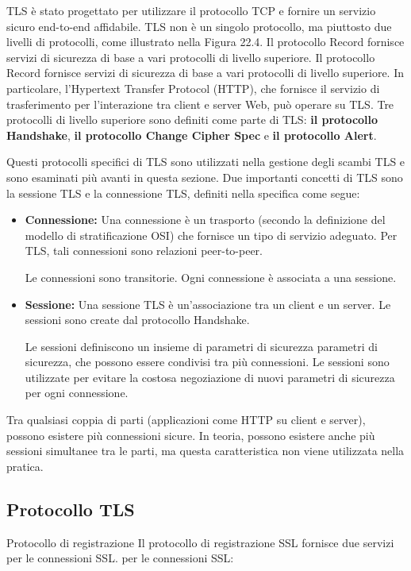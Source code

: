 TLS è stato progettato per utilizzare il protocollo TCP e fornire un servizio sicuro end-to-end affidabile. TLS non è un singolo protocollo, ma piuttosto due livelli di protocolli, come illustrato nella Figura 22.4. Il protocollo Record fornisce servizi di sicurezza di base a vari protocolli di livello superiore. Il protocollo Record fornisce servizi di sicurezza di base a vari protocolli di livello superiore. In particolare, l'Hypertext Transfer Protocol (HTTP), che fornisce il servizio di trasferimento per l'interazione tra client e server Web, può operare su TLS. Tre protocolli di livello superiore sono definiti come parte di TLS: \textbf{il protocollo Handshake}, \textbf{il protocollo Change Cipher Spec} e \textbf{il protocollo Alert}. 

\singlespacing

Questi protocolli specifici di TLS sono utilizzati nella gestione degli scambi TLS e sono esaminati più avanti in questa sezione. Due importanti concetti di TLS sono la sessione TLS e la connessione TLS, definiti nella specifica come segue:
\begin{itemize}
    \item \textbf{Connessione:} Una connessione è un trasporto (secondo la definizione del modello di stratificazione OSI) che fornisce un tipo di servizio adeguato. Per TLS, tali connessioni sono relazioni peer-to-peer.
    
    Le connessioni sono transitorie. Ogni connessione è associata a una sessione.
    
    \item \textbf{Sessione:} Una sessione TLS è un'associazione tra un client e un server. Le sessioni sono create dal protocollo Handshake. 
    
    Le sessioni definiscono un insieme di parametri di sicurezza parametri di sicurezza, che possono essere condivisi tra più connessioni. Le sessioni sono utilizzate per evitare la costosa negoziazione di nuovi parametri di sicurezza per ogni connessione.
\end{itemize}
Tra qualsiasi coppia di parti (applicazioni come HTTP su client e server), possono esistere più connessioni sicure. In teoria, possono esistere anche più sessioni simultanee tra le parti, ma questa caratteristica non viene utilizzata nella pratica.
\subsection{Protocollo TLS}
Protocollo di registrazione Il protocollo di registrazione SSL fornisce due servizi per le connessioni SSL.
per le connessioni SSL:

